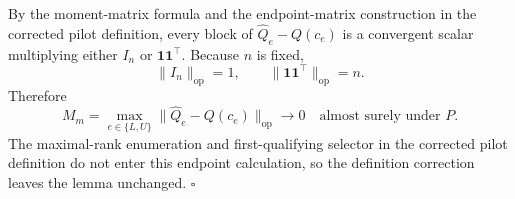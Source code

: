 By the moment-matrix formula and the endpoint-matrix construction in the corrected pilot definition, every block of \(\widehat Q_e-Q(c_e)\) is a convergent scalar multiplying either \(I_n\) or \(\mathbf1\mathbf1^{\top}\).  Because \(n\) is fixed,
\[
\lVert I_n\rVert_{\mathrm{op}}=1,
\qquad
\lVert\mathbf1\mathbf1^{\top}\rVert_{\mathrm{op}}=n.
\tag{9}
\]
Therefore
\[
M_m=\max_{e\in\{L,U\}}
\lVert\widehat Q_e-Q(c_e)\rVert_{\mathrm{op}}
\longrightarrow0
\quad\text{almost surely under }P.
\tag{10}
\]
The maximal-rank enumeration and first-qualifying selector in the corrected pilot definition do not enter this endpoint calculation, so the definition correction leaves the lemma unchanged. \(\square\)